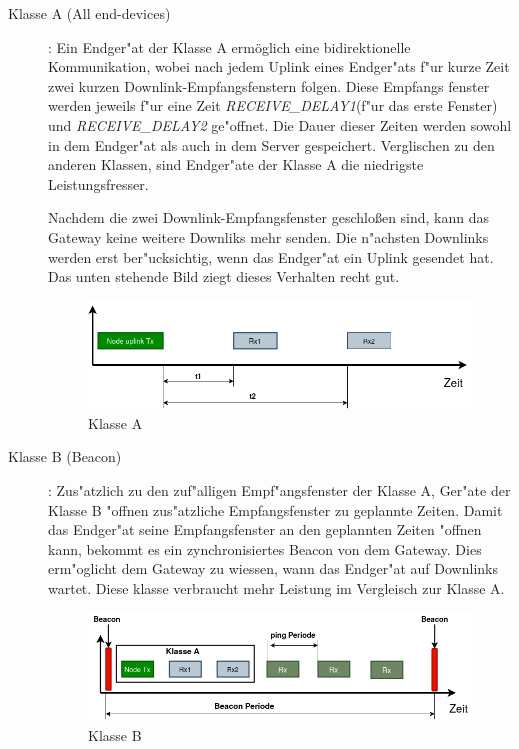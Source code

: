 \begin{description}
	\item [Klasse A (All end-devices) \label{classA}]: Ein Endger"at 
	der Klasse A ermöglich eine bidirektionelle Kommunikation, wobei 
	nach jedem Uplink eines Endger"ats f"ur kurze Zeit zwei kurzen 
	Downlink-Empfangsfenstern folgen. Diese Empfangs fenster werden 
	jeweils f"ur eine Zeit \textit{RECEIVE\_DELAY1}(f"ur das erste 
	Fenster) und \textit{RECEIVE\_DELAY2} ge"offnet. Die Dauer dieser 
	Zeiten werden sowohl in dem Endger"at als auch in dem Server 
	gespeichert. Verglischen zu den anderen Klassen, sind Endger"ate 
	der Klasse A die niedrigste Leistungsfresser. 
	
	Nachdem die zwei Downlink-Empfangsfenster geschlo\ss{}en sind, kann 
	das Gateway keine weitere Downliks mehr senden. Die n"achsten 
	Downlinks werden erst ber"ucksichtig, wenn das Endger"at ein Uplink 
	gesendet hat.
	Das unten stehende Bild ziegt dieses Verhalten recht gut.
	
	 \begin{figure}[h]
	 	\centering
	 	\includegraphics[width=14cm]{source/images/ClassA}
	 	\caption{Klasse A \label{fig:classA}}
	 \end{figure}
	
	\item [Klasse B (Beacon)]: Zus"atzlich zu den zuf"alligen 
	Empf"angsfenster der Klasse A, Ger"ate der Klasse B "offnen 
	zus"atzliche Empfangsfenster zu geplannte Zeiten. Damit das 
	Endger"at seine Empfangsfenster an den geplannten Zeiten "offnen 
	kann, bekommt es  ein zynchronisiertes Beacon von dem Gateway. Dies 
	erm"oglicht dem Gateway zu wiessen, wann das Endger"at auf Downlinks wartet. Diese klasse verbraucht mehr Leistung im  Vergleisch zur Klasse A. 
	
	 \begin{figure}[h]
		\centering
		\includegraphics[width=12cm]{source/images/ClassB}
		\caption{Klasse B \label{fig:classB}}
	\end{figure}
	

\end{description}
